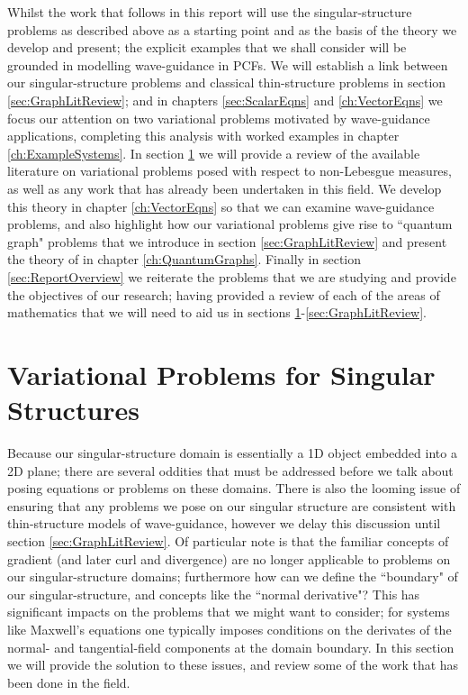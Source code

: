 Whilst the work that follows in this report will use the singular-structure problems as described above as a starting point and as the basis of the theory we develop and present; the explicit examples that we shall consider will be grounded in modelling wave-guidance in PCFs.
We will establish a link between our singular-structure problems and classical thin-structure problems in section \ref{sec:GraphLitReview}; and in chapters \ref{sec:ScalarEqns} and \ref{ch:VectorEqns} we focus our attention on two variational problems motivated by wave-guidance applications, completing this analysis with worked examples in chapter \ref{ch:ExampleSystems}.
In section \ref{sec:VariationalProblemLitReview} we will provide a review of the available literature on variational problems posed with respect to non-Lebesgue measures, as well as any work that has already been undertaken in this field.
We develop this theory in chapter \ref{ch:VectorEqns} so that we can examine wave-guidance problems, and also highlight how our variational problems give rise to ``quantum graph" problems that we introduce in section \ref{sec:GraphLitReview} and present the theory of in chapter \ref{ch:QuantumGraphs}.
Finally in section \ref{sec:ReportOverview} we reiterate the problems that we are studying and provide the objectives of our research; having provided a review of each of the areas of mathematics that we will need to aid us in sections \ref{sec:VariationalProblemLitReview}-\ref{sec:GraphLitReview}.

\section{Variational Problems for Singular Structures} \label{sec:VariationalProblemLitReview}
Because our singular-structure domain is essentially a 1D object embedded into a 2D plane; there are several oddities that must be addressed before we talk about posing equations or problems on these domains.
There is also the looming issue of ensuring that any problems we pose on our singular structure are consistent with thin-structure models of wave-guidance, however we delay this discussion until section \ref{sec:GraphLitReview}.
Of particular note is that the familiar concepts of gradient (and later curl and divergence) are no longer applicable to problems on our singular-structure domains; furthermore how can we define the ``boundary" of our singular-structure, and concepts like the ``normal derivative"?
This has significant impacts on the problems that we might want to consider; for systems like Maxwell's equations one typically imposes conditions on the derivates of the normal- and tangential-field components at the domain boundary. 
In this section we will provide the solution to these issues, and review some of the work that has been done in the field. \newline

